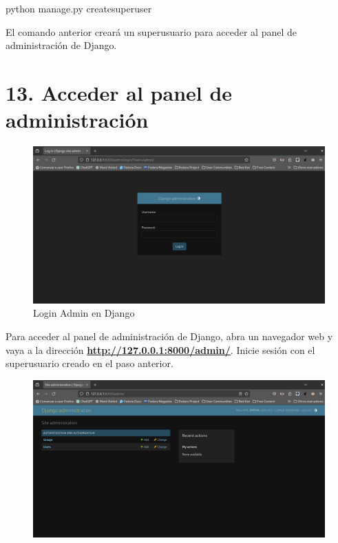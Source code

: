 \documentclass[
  a4paper,
  DIV=11,
  numbers=noendperiod,
  onepage,
  openany]{scrreprt}
\newenvironment{Shaded}{\begin{snugshade}}{\end{snugshade}}
\newcommand{\ExtensionTok}[1]{\textcolor[rgb]{0.00,0.23,0.31}{#1}}
\newcommand{\NormalTok}[1]{\textcolor[rgb]{0.00,0.23,0.31}{#1}}
\begin{document}
\begin{tcolorbox}
\begin{Shaded}
\begin{Highlighting}[]
\ExtensionTok{python}\NormalTok{ manage.py createsuperuser}
\end{Highlighting}
\end{Shaded}

El comando anterior creará un superusuario para acceder al panel de
administración de Django.

\section{13. Acceder al panel de
administración}\label{acceder-al-panel-de-administraciuxf3n}

\begin{figure}[H]

{\centering \includegraphics{images/login_admin_django.png}

}

\caption{Login Admin en Django}

\end{figure}%

Para acceder al panel de administración de Django, abra un navegador web
y vaya a la dirección \textbf{\url{http://127.0.0.1:8000/admin/}}.
Inicie sesión con el superusuario creado en el paso anterior.

\begin{figure}[H]

{\centering \includegraphics{images/admin_django.png}

}
\end{figure}
\end{tcolorbox}
\end{document}
